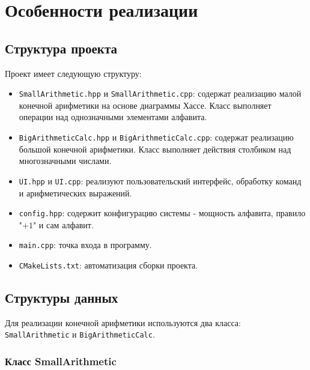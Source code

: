 \section{Особенности реализации}

\subsection{Структура проекта}

Проект имеет следующую структуру: 
\begin{itemize}
    \item \texttt{SmallArithmetic.hpp} и \texttt{SmallArithmetic.cpp}: содержат реализацию малой конечной арифметики на основе диаграммы Хассе.  Класс выполняет операции над однозначными элементами алфавита.
    
    \item \texttt{BigArithmeticCalc.hpp} и \texttt{BigArithmeticCalc.cpp}: содержат реализацию большой конечной арифметики. Класс выполняет действия столбиком над многозначными числами.
    
    \item \texttt{UI.hpp} и \texttt{UI.cpp}:  реализуют пользовательский интерфейс, обработку команд и арифметических выражений. 
    
    \item \texttt{config.hpp}: содержит конфигурацию системы - мощность алфавита, правило "$+1$" и сам алфавит.
    
    \item \texttt{main.cpp}: точка входа в программу. 
    
    \item \texttt{CMakeLists.txt}: автоматизация сборки проекта.
\end{itemize}

\subsection{Структуры данных}

Для реализации конечной арифметики используются два класса:\\ \texttt{SmallArithmetic} и \texttt{BigArithmeticCalc}. 

\subsubsection{Класс SmallArithmetic}

